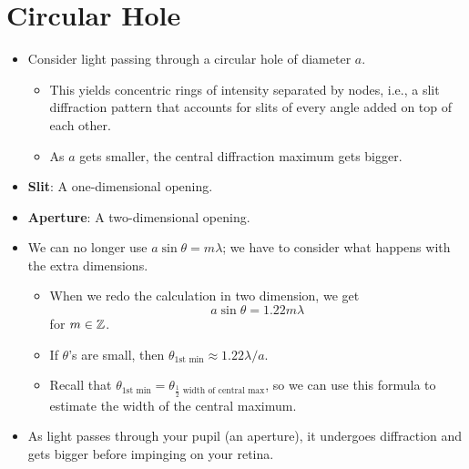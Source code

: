 \documentclass[../notes.tex]{subfiles}
\begin{document}
\section{Circular Hole}
\begin{itemize}
    \item Consider light passing through a circular hole of diameter $a$.
    \begin{itemize}
        \item This yields concentric rings of intensity separated by nodes, i.e., a slit diffraction pattern that accounts for slits of every angle added on top of each other.
        \item As $a$ gets smaller, the central diffraction maximum gets bigger.
    \end{itemize}
    \item \textbf{Slit}: A one-dimensional opening.
    \item \textbf{Aperture}: A two-dimensional opening.
    \item We can no longer use $a\sin\theta=m\lambda$; we have to consider what happens with the extra dimensions.
    \begin{itemize}
        \item When we redo the calculation in two dimension, we get
        \begin{equation*}
            a\sin\theta = 1.22m\lambda
        \end{equation*}
        for $m\in\mathbb{Z}$.
        \item If $\theta$'s are small, then $\theta_\text{1st min}\approx 1.22\lambda/a$.
        \item Recall that $\theta_\text{1st min}=\theta_\text{$\frac{1}{2}$ width of central max}$, so we can use this formula to estimate the width of the central maximum.
    \end{itemize}
    \item As light passes through your pupil (an aperture), it undergoes diffraction and gets bigger before impinging on your retina.
    \begin{figure}[h!]
        \centering
\end{figure}
\end{itemize}
\end{document}

